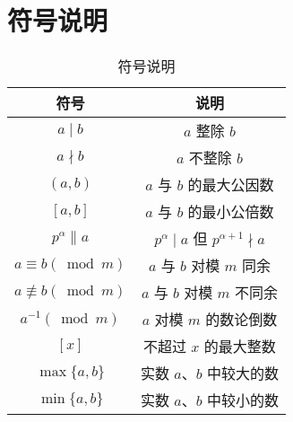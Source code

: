 \documentclass{CyberMath}
\begin{document}
\maketitle
\tableofcontents
\newpage
\section*{符号说明}
\begin{table}[ht]
  \centering
  \begin{tabular}{cc}
    \hline
  符号 & 说明 \\  \hline
  $a \mid b$ & $a$ 整除 $b$ \\ 
  $a \nmid b$ & $a$ 不整除 $b$ \\ 
  $(a, b)$ & $a$ 与 $b$ 的最大公因数 \\ 
  $[a, b]$ & $a$ 与 $b$ 的最小公倍数 \\ 
  $p^{\alpha} \| a$ & $p^{\alpha} \mid a$ 但 $p^{\alpha+1} \nmid a$ \\ 
  $a \equiv b(\bmod m)$ & $a$ 与 $b$ 对模 $m$ 同余 \\ 
  $a \not\equiv b(\bmod m)$ & $a$ 与 $b$ 对模 $m$ 不同余 \\ 
  $a^{-1}(\bmod m)$ & $a$ 对模 $m$ 的数论倒数 \\ 
  $[x]$ & 不超过 $x$ 的最大整数 \\ 
  $\max \{a, b\}$ & 实数 $a 、 b$ 中较大的数 \\ 
  $\min \{a, b\}$ & 实数 $a 、 b$ 中较小的数 \\ \hline
  \end{tabular}
  \caption{符号说明}
  \end{table}


\end{document}
